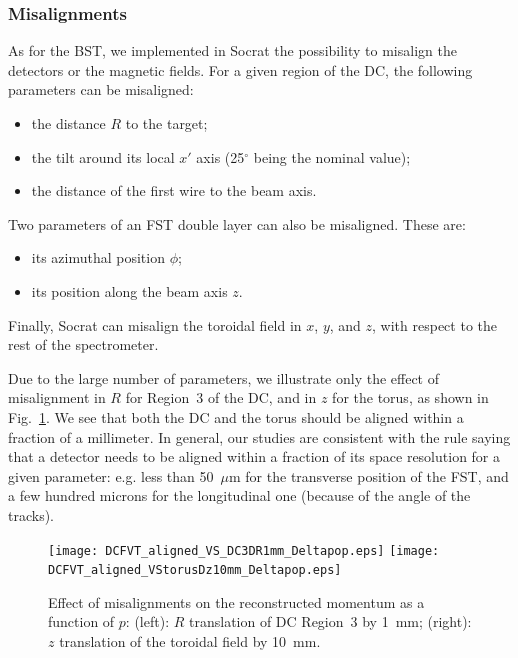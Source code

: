\subsubsection{Misalignments}

As for the BST, we implemented in Socrat the possibility to misalign the detectors 
or the magnetic fields.  For a given region of the DC, the following parameters can 
be misaligned:

\begin{itemize}
\item the distance $R$ to the target;
\item the tilt around its local $x'$ axis (25$^\circ$ being the nominal value);
\item the distance of the first wire to the beam axis.
\end{itemize}

\noindent
Two parameters of an FST double layer can also be misaligned.  These are:

\begin{itemize}
\item its azimuthal position $\phi$;
\item its position along the beam axis $z$.
\end{itemize}

\noindent
Finally, Socrat can misalign the toroidal field in $x$, $y$, and $z$, with respect 
to the rest of the spectrometer.

Due to the large number of parameters, we illustrate only the effect of misalignment 
in $R$ for Region~3 of the DC, and in $z$ for the torus, as shown in 
Fig.~\ref{sec_forward:pic_FTmisalign}.  We see that both the DC and the torus should 
be aligned within a fraction of a millimeter.  In general, our studies are consistent 
with the rule saying that a detector needs to be aligned within a fraction of its 
space resolution for a given parameter: e.g. less than 50~$\mu$m for the transverse 
position of the FST, and a few hundred microns for the longitudinal one (because of 
the angle of the tracks).

\begin{figure}[ht!]
\centering
\texttt{[image: DCFVT\_aligned\_VS\_DC3DR1mm\_Deltapop.eps]}
\texttt{[image: DCFVT\_aligned\_VStorusDz10mm\_Deltapop.eps]}
\caption{\small{Effect of misalignments on the reconstructed momentum as a function 
of $p$: (left): $R$ translation of DC Region~3 by 1~mm; (right): $z$ translation of 
the toroidal field by 10~mm.}}
\label{sec_forward:pic_FTmisalign}
\end{figure}

